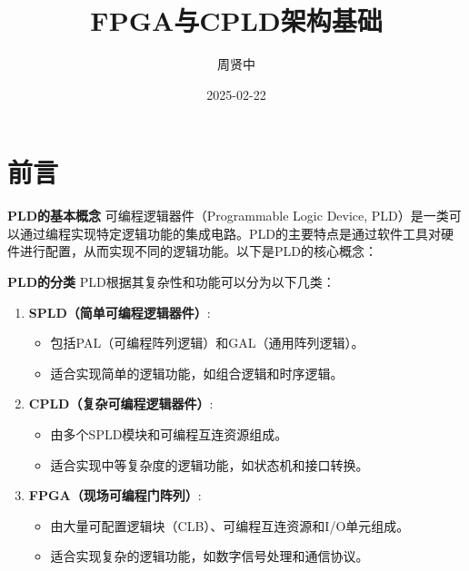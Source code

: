 \documentclass[
  ignorenonframetext,
  chinese,
]{beamer}
\title{FPGA与CPLD架构基础}
\author{周贤中}
\date{2025-02-22}
\providecommand{\tightlist}{%
  \setlength{\itemsep}{0pt}\setlength{\parskip}{0pt}}
\begin{document}
\frame{\titlepage}

\section{前言}\label{ux524dux8a00}

\begin{frame}{\textbf{PLD的基本概念}}
\label{pldux7684ux57faux672cux6982ux5ff5}
可编程逻辑器件（Programmable Logic Device,
PLD）是一类可以通过编程实现特定逻辑功能的集成电路。PLD的主要特点是通过软件工具对硬件进行配置，从而实现不同的逻辑功能。以下是PLD的核心概念：
\end{frame}

\begin{frame}
\begin{block}{\textbf{PLD的分类}}
\label{pldux7684ux5206ux7c7b}
PLD根据其复杂性和功能可以分为以下几类：

\begin{enumerate}
\tightlist
\item
  \textbf{SPLD（简单可编程逻辑器件）}:

  \begin{itemize}
  \tightlist
  \item
    包括PAL（可编程阵列逻辑）和GAL（通用阵列逻辑）。\\
  \item
    适合实现简单的逻辑功能，如组合逻辑和时序逻辑。\\
  \end{itemize}
\item
  \textbf{CPLD（复杂可编程逻辑器件）}:

  \begin{itemize}
  \tightlist
  \item
    由多个SPLD模块和可编程互连资源组成。\\
  \item
    适合实现中等复杂度的逻辑功能，如状态机和接口转换。\\
  \end{itemize}
\item
  \textbf{FPGA（现场可编程门阵列）}:

  \begin{itemize}
  \tightlist
  \item
    由大量可配置逻辑块（CLB）、可编程互连资源和I/O单元组成。\\
  \item
    适合实现复杂的逻辑功能，如数字信号处理和通信协议。
  \end{itemize}
\end{enumerate}
\end{block}
\end{frame}
\end{document}
